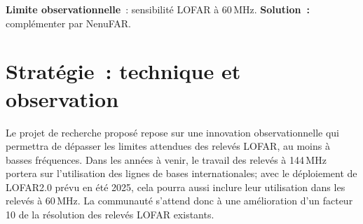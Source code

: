 \begin{tcolorbox}[colback=green!10, colframe=green!50!black, arc=3mm, boxrule=1pt]
	\textbf{Limite observationnelle}~: sensibilit\'e LOFAR \`a 60\,MHz. \textbf{Solution~:} compl\'ementer par NenuFAR. 
\end{tcolorbox}
%
%
%

\section{Strat\'egie~: technique et observation}

\pg
Le projet de recherche propos\'e repose sur une innovation observationnelle qui permettra de d\'epasser les limites attendues des relev\'es LOFAR, au moins \`a basses fr\'equences. Dans les ann\'ees \`a venir, le travail des relev\'es \`a 144\,MHz portera sur l'utilisation des lignes de bases internationales; avec le d\'eploiement de LOFAR2.0 pr\'evu en \'et\'e 2025, cela pourra aussi inclure leur utilisation dans les relev\'es \`a 60\,MHz. La communaut\'e s'attend donc \`a une am\'elioration d'un facteur 10 de la r\'esolution des relev\'es LOFAR existants.  

